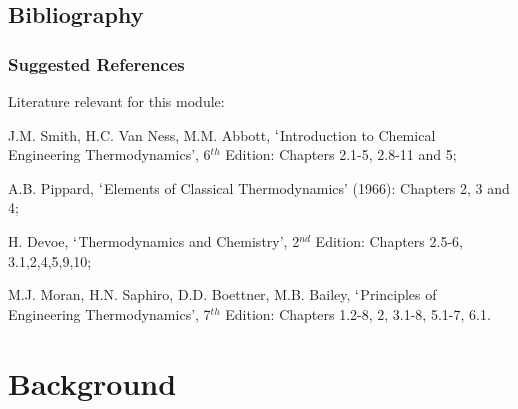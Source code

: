 \documentclass[10pt,compress,handout,ignorenonframetext]{beamer}
\begin{document}
\subsection{Bibliography} 

\begin{frame}
 \frametitle{Suggested References}
  Literature relevant for this module:
  \begin{enumerate}[{[}1{]}]
   \item J.M. Smith, H.C. Van Ness, M.M. Abbott, $\lq$Introduction to Chemical Engineering Thermodynamics', 6$^{th}$ Edition: Chapters 2.1-5, 2.8-11 and 5;
   \item A.B. Pippard, $\lq$Elements of Classical Thermodynamics' (1966): Chapters 2, 3 and 4;
   \item H. Devoe, $\lq$Thermodynamics and Chemistry', 2$^{nd}$ Edition: Chapters 2.5-6, 3.1,2,4,5,9,10;
   \item M.J. Moran, H.N. Saphiro, D.D. Boettner, M.B. Bailey, $\lq$Principles of Engineering Thermodynamics', 7$^{th}$ Edition: Chapters 1.2-8, 2, 3.1-8, 5.1-7, 6.1.
  \end{enumerate}
\end{frame}
 
\section{Background} 
\end{document}
